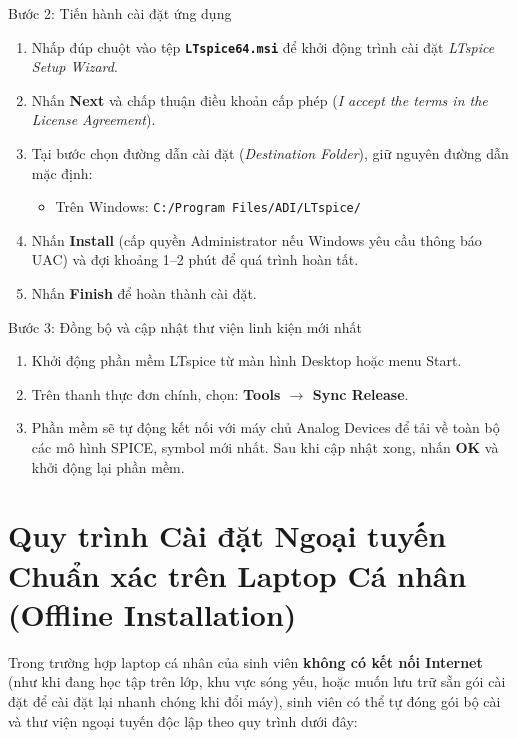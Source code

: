\documentclass[11pt,a4paper]{article}
\newcommand{\code}[1]{\texttt{\color{navy}\textbf{#1}}}
\newcommand{\pathdir}[1]{\texttt{\color{darkblue}#1}}
\begin{document}
\begin{stepbox}{Bước 2: Tiến hành cài đặt ứng dụng}
\begin{enumerate}[itemsep=2pt]
  \item Nhấp đúp chuột vào tệp \code{LTspice64.msi} để khởi động trình cài đặt \textit{LTspice Setup Wizard}.
  \item Nhấn \textbf{Next} và chấp thuận điều khoản cấp phép (\textit{I accept the terms in the License Agreement}).
  \item Tại bước chọn đường dẫn cài đặt (\textit{Destination Folder}), giữ nguyên đường dẫn mặc định:
  \begin{itemize}
    \item Trên Windows: \pathdir{C:/Program Files/ADI/LTspice/}
  \end{itemize}
  \item Nhấn \textbf{Install} (cấp quyền Administrator nếu Windows yêu cầu thông báo UAC) và đợi khoảng 1--2 phút để quá trình hoàn tất.
  \item Nhấn \textbf{Finish} để hoàn thành cài đặt.
\end{enumerate}
\end{stepbox}

\begin{stepbox}{Bước 3: Đồng bộ và cập nhật thư viện linh kiện mới nhất}
\begin{enumerate}[itemsep=2pt]
  \item Khởi động phần mềm LTspice từ màn hình Desktop hoặc menu Start.
  \item Trên thanh thực đơn chính, chọn: \textbf{Tools $\rightarrow$ Sync Release}.
  \item Phần mềm sẽ tự động kết nối với máy chủ Analog Devices để tải về toàn bộ các mô hình SPICE, symbol mới nhất. Sau khi cập nhật xong, nhấn \textbf{OK} và khởi động lại phần mềm.
\end{enumerate}
\end{stepbox}

\section{Quy trình Cài đặt Ngoại tuyến Chuẩn xác trên Laptop Cá nhân (Offline Installation)}
\label{sec:offline}

Trong trường hợp laptop cá nhân của sinh viên \textbf{không có kết nối Internet} (như khi đang học tập trên lớp, khu vực sóng yếu, hoặc muốn lưu trữ sẵn gói cài đặt để cài đặt lại nhanh chóng khi đổi máy), sinh viên có thể tự đóng gói bộ cài và thư viện ngoại tuyến độc lập theo quy trình dưới đây:
\end{document}

